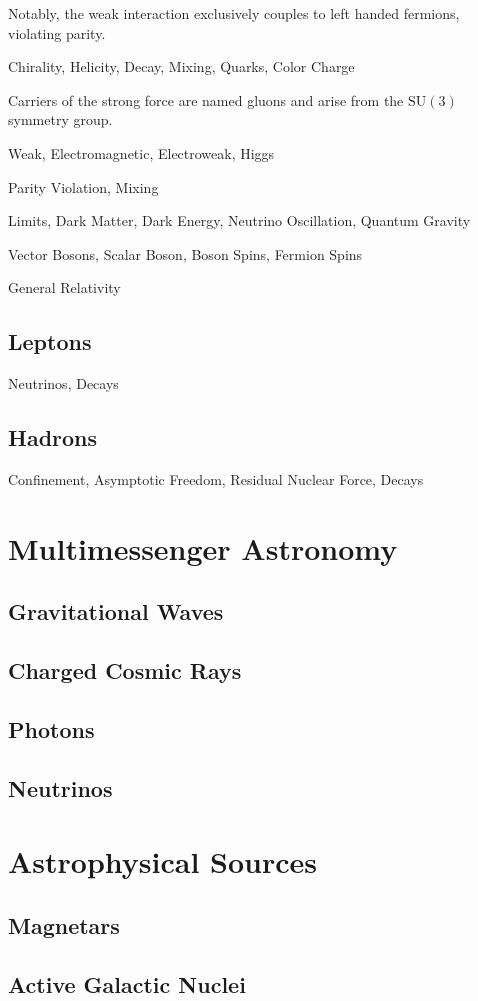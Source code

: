 \newpage

Notably, the weak interaction exclusively couples to left handed fermions, violating parity.

Chirality, Helicity, Decay, Mixing, Quarks, Color Charge

Carriers of the strong force are named gluons and arise from the $\text{SU}(3)$ symmetry group. 

Weak, Electromagnetic, Electroweak, Higgs

Parity Violation, Mixing

Limits, Dark Matter, Dark Energy, Neutrino Oscillation, Quantum Gravity

Vector Bosons, Scalar Boson, Boson Spins, Fermion Spins

General Relativity

\subsection*{Leptons}
\label{sub:leptons}

Neutrinos, Decays

\subsection*{Hadrons}
\label{sub:hadrons}

Confinement, Asymptotic Freedom, Residual Nuclear Force, Decays

\section{Multimessenger Astronomy}
\label{sec:multimessenger}

\subsection*{Gravitational Waves}
\label{sub:gravitational}

\subsection*{Charged Cosmic Rays}
\label{sub:rays}

\subsection*{Photons}
\label{sub:photons}

\subsection*{Neutrinos}
\label{sub:neutrinos}

\section{Astrophysical Sources}
\label{sec:sources}

\subsection*{Magnetars}
\label{sub:magnetars}

\subsection*{Active Galactic Nuclei}
\label{sub:nuclei}
